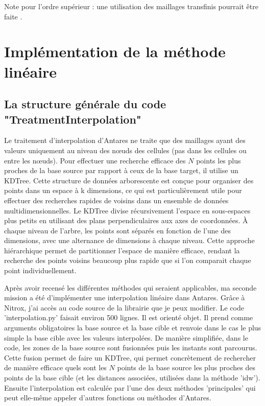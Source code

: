 Note pour l'ordre supérieur : une utilisation des maillages transfinis pourrait être faite \cite{camarero2024}.




\newpage
\section{Implémentation de la méthode linéaire}

\subsection{La structure générale du code "TreatmentInterpolation"}

Le traitement d'interpolation d'Antares ne traite que des maillages ayant des valeurs uniquement au niveau des nœuds des cellules (pas dans les cellules ou entre les nœuds).
Pour effectuer une recherche efficace des \(N\) points les plus proches de la base source par rapport à ceux de la base target, il utilise un \ac{KDTree}. Cette structure de données arborescente est conçue pour organiser des points dans un espace à k dimensions, ce qui est particulièrement utile pour effectuer des recherches rapides de voisins dans un ensemble de données multidimensionnelles.
Le KDTree divise récursivement l'espace en sous-espaces plus petits en utilisant des plans perpendiculaires aux axes de coordonnées. À chaque niveau de l'arbre, les points sont séparés en fonction de l'une des dimensions, avec une alternance de dimensions à chaque niveau. Cette approche hiérarchique permet de partitionner l'espace de manière efficace, rendant la recherche des points voisins beaucoup plus rapide que si l'on comparait chaque point individuellement.



Après avoir recensé les différentes méthodes qui seraient applicables, ma seconde mission a été d'implémenter une interpolation linéaire dans Antares. Grâce à Nitrox, j'ai accès au code source de la librairie que je peux modifier. Le code 'interpolation.py' faisait environ 500 lignes. Il est orienté objet. 
Il prend comme arguments obligatoires la base source et la base cible et renvoie dans le cas le plus simple la base cible avec les valeurs interpolées.
De manière simplifiée, dans le code, les zones de la base source sont fusionnées puis les instants sont parcourus. 
Cette fusion permet de faire un KDTree, qui permet concrètement de rechercher de manière efficace quels sont les \( N \) points de la base source les plus proches des points de la base cible (et les distances associées, utilisées dans la méthode 'idw').
Ensuite l'interpolation est calculée par l'une des deux méthodes 'principales' qui peut elle-même appeler d'autres fonctions ou méthodes d'Antares. %



